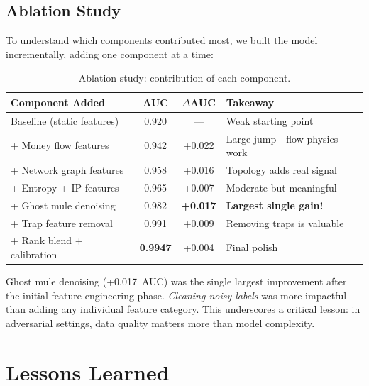 \documentclass[11pt, a4paper]{article}
\begin{document}
\subsection{Ablation Study}

To understand which components contributed most, we built the model incrementally, adding
one component at a time:

\begin{table}[H]
\centering\small
\caption{Ablation study: contribution of each component.}
\begin{tabular}{@{}lccp{5.5cm}@{}}
\toprule
\textbf{Component Added} & \textbf{AUC} & \textbf{$\Delta$AUC} & \textbf{Takeaway} \\
\midrule
Baseline (static features)    & 0.920 & ---    & Weak starting point \\
+ Money flow features          & 0.942 & +0.022 & Large jump---flow physics work \\
+ Network graph features       & 0.958 & +0.016 & Topology adds real signal \\
+ Entropy + IP features        & 0.965 & +0.007 & Moderate but meaningful \\
\rowcolor{yellow!12}
+ Ghost mule denoising         & 0.982 & \textbf{+0.017} & \textbf{Largest single gain!} \\
+ Trap feature removal         & 0.991 & +0.009 & Removing traps is valuable \\
+ Rank blend + calibration     & \textbf{0.9947} & +0.004 & Final polish \\
\bottomrule
\end{tabular}
\end{table}

\begin{insightbox}
Ghost mule denoising (+0.017~AUC) was the single largest improvement after the initial
feature engineering phase. \emph{Cleaning noisy labels} was more impactful than adding any
individual feature category. This underscores a critical lesson: in adversarial settings,
data quality matters more than model complexity.
\end{insightbox}


\section{Lessons Learned}
\end{document}
